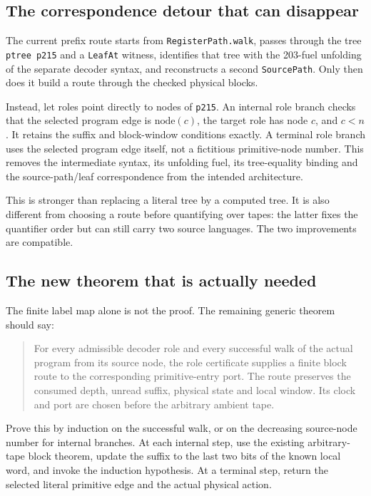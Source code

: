 \documentclass[11pt]{article}
\begin{document}
\subsection{The correspondence detour that can disappear}
The current prefix route starts from \texttt{RegisterPath.walk}, passes through the tree \texttt{ptree p215} and a \texttt{LeafAt} witness, identifies that tree with the 203-fuel unfolding of the separate decoder syntax, and reconstructs a second \texttt{SourcePath}. Only then does it build a route through the checked physical blocks.

Instead, let roles point directly to nodes of \texttt{p215}. An internal role branch checks that the selected program edge is $\mathrm{node}(c)$, the target role has node $c$, and $c<n$. It retains the suffix and block-window conditions exactly. A terminal role branch uses the selected program edge itself, not a fictitious primitive-node number. This removes the intermediate syntax, its unfolding fuel, its tree-equality binding and the source-path/leaf correspondence from the intended architecture.

This is stronger than replacing a literal tree by a computed tree. It is also different from choosing a route before quantifying over tapes: the latter fixes the quantifier order but can still carry two source languages. The two improvements are compatible.

\subsection{The new theorem that is actually needed}
The finite label map alone is not the proof. The remaining generic theorem should say:
\begin{quote}
For every admissible decoder role and every successful walk of the actual program from its source node, the role certificate supplies a finite block route to the corresponding primitive-entry port. The route preserves the consumed depth, unread suffix, physical state and local window. Its clock and port are chosen before the arbitrary ambient tape.
\end{quote}
Prove this by induction on the successful walk, or on the decreasing source-node number for internal branches. At each internal step, use the existing arbitrary-tape block theorem, update the suffix to the last two bits of the known local word, and invoke the induction hypothesis. At a terminal step, return the selected literal primitive edge and the actual physical action.
\end{document}
